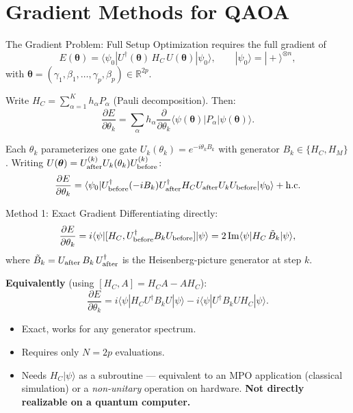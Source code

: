 \documentclass{beamer}
\begin{document}
\section{Gradient Methods for QAOA}

\begin{frame}{The Gradient Problem: Full Setup}
Optimization requires the full gradient of
\[
E(\boldsymbol{\theta})
= \langle\psi_0|U^\dagger(\boldsymbol{\theta})\,H_C\,U(\boldsymbol{\theta})|\psi_0\rangle,
\qquad
|\psi_0\rangle = |+\rangle^{\otimes n},
\]
with $\boldsymbol{\theta} = (\gamma_1,\beta_1,\dots,\gamma_p,\beta_p)\in\mathbb{R}^{2p}$.

\medskip

Write $H_C = \sum_{\alpha=1}^K h_\alpha P_\alpha$ (Pauli decomposition). Then:
\[
\frac{\partial E}{\partial\theta_k}
= \sum_\alpha h_\alpha
\frac{\partial}{\partial\theta_k}
\langle\psi(\boldsymbol{\theta})|P_\alpha|\psi(\boldsymbol{\theta})\rangle.
\]

Each $\theta_k$ parameterizes one gate $U_k(\theta_k) = e^{-i\theta_k B_k}$
with generator $B_k \in \{H_C, H_M\}$.
Writing $U(\boldsymbol{\theta}) = U_{\rm after}^{(k)} U_k(\theta_k) U_{\rm before}^{(k)}$:
\[
\frac{\partial E}{\partial\theta_k}
= \langle\psi_0|U_{\rm before}^\dagger (-iB_k) U_{\rm after}^\dagger H_C
U_{\rm after} U_k U_{\rm before}|\psi_0\rangle + \mathrm{h.c.}
\]
\end{frame}


\begin{frame}{Method 1: Exact Gradient}
Differentiating directly:
\[
\frac{\partial E}{\partial\theta_k}
= i\langle\psi|[H_C, U_{\rm before}^\dagger B_k U_{\rm before}]|\psi\rangle
= 2\,\mathrm{Im}\langle\psi|H_C\,\tilde{B}_k|\psi\rangle,
\]
where $\tilde{B}_k = U_{\rm after}\,B_k\,U_{\rm after}^\dagger$ is the
Heisenberg-picture generator at step $k$.

\medskip

\textbf{Equivalently} (using $[H_C, A] = H_CA - AH_C$):
\[
\frac{\partial E}{\partial\theta_k}
= i\langle\psi|H_C U^\dagger B_k U|\psi\rangle
- i\langle\psi|U^\dagger B_k U H_C|\psi\rangle.
\]

\begin{itemize}
\item[\textbf{+}] Exact, works for any generator spectrum.
\item[\textbf{+}] Requires only $N = 2p$ evaluations.
\item[\textbf{--}] Needs $H_C|\psi\rangle$ as a subroutine ---
  equivalent to an MPO application (classical simulation) or
  a \emph{non-unitary} operation on hardware.
  \textbf{Not directly realizable on a quantum computer.}
\end{itemize}
\end{frame}
\end{document}
